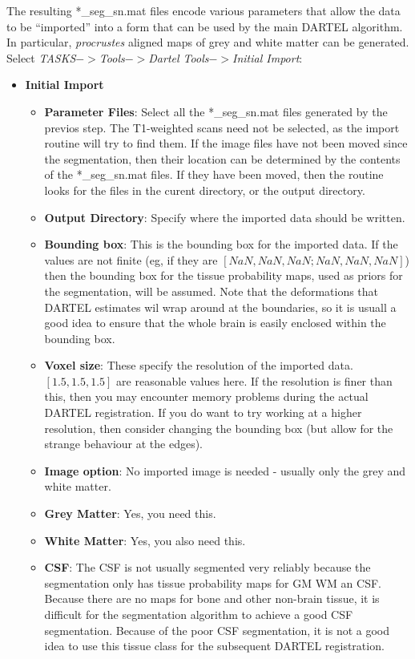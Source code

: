 The resulting *\_seg\_sn.mat files encode various parameters that allow the data to be ``imported'' into a form that can be used by the main DARTEL algorithm.
In particular, \emph{procrustes} aligned maps of grey and white matter can be generated.
Select \emph{TASKS$->$Tools$->$Dartel Tools$->$Initial Import}:
\begin{itemize}
\item{{\bf Initial Import}
  \begin{itemize}
  \item{{\bf Parameter Files}: Select all the *\_seg\_sn.mat files generated by the previos step.  The T1-weighted scans need not be selected, as the import routine will try to find them.  If the image files have not been moved since the segmentation, then their location can be determined by the contents of the *\_seg\_sn.mat files. If they have been moved, then the routine looks for the files in the curent directory, or the output directory.
  }
  \item{{\bf Output Directory}: Specify where the imported data should be written.
  }
  \item{{\bf Bounding box}: This is the bounding box for the imported data.  If the values are not finite (eg, if they are $[NaN, NaN, NaN; NaN, NaN, NaN]$) then the bounding box for the tissue probability maps, used as priors for the segmentation, will be assumed. Note that the deformations that DARTEL estimates wil wrap around at the boundaries, so it is usuall a good idea to ensure that the whole brain is easily enclosed within the bounding box.
  }
  \item{{\bf Voxel size}: These specify the resolution of the imported data.  $[1.5, 1.5, 1.5]$ are reasonable values here.  If the resolution is finer than this, then you may encounter memory problems during the actual DARTEL registration.
If you do want to try working at a higher resolution, then consider changing the bounding box (but allow for the strange behaviour at the edges).
  }
  \item{{\bf Image option}: No imported image is needed - usually only the grey and white matter.
  }
  \item{{\bf Grey Matter}: Yes, you need this.
  }
  \item{{\bf White Matter}: Yes, you also need this.
  }
  \item{{\bf CSF}: The CSF is not usually segmented very reliably because the segmentation only has tissue probability maps for GM WM an CSF.  Because there are no maps for bone and other non-brain tissue, it is difficult for the segmentation algorithm to achieve a good CSF segmentation. Because of the poor CSF segmentation, it is not a good idea to use this tissue class for the subsequent DARTEL registration.
  }
  \end{itemize}
}
\end{itemize}

